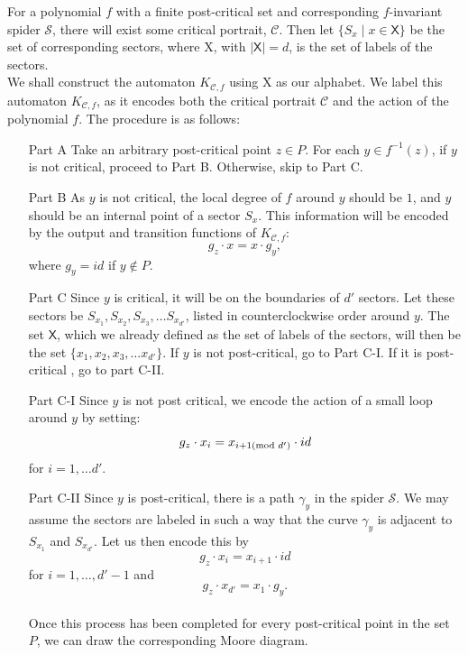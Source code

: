 \documentclass[11pt]{amsart}
\theoremstyle{definition}
\theoremstyle{remark}
\numberwithin{equation}{section}
\begin{document}
\indent For a polynomial $f$ with a finite post-critical set and corresponding $f$-invariant spider $\mathcal{S}$, there will exist some critical portrait, $\mathcal{C}$. Then let $\{S_x \mid x\in \textsf{X}\}$ be the set of corresponding sectors, where \textsf{X}, with $|\textsf{X}|=d$, is the set of labels of the sectors.\\
\indent We shall construct the automaton $K_{\mathcal{C},f}$ using \textsf{X} as our alphabet. We label this automaton $K_{\mathcal{C},f}$, as it encodes both the critical portrait $\mathcal{C}$ and the action of the polynomial $f$. The procedure is as follows:\\


\begin{enumerate}

\item[Part A] Take an arbitrary post-critical point $z\in P$. For each $y\in f^{-1}(z)$, if $y$ is not critical, proceed to Part B. Otherwise, skip to Part C.\\
\item[Part B] As $y$ is not critical, the local degree of $f$ around $y$ should be $1$, and $y$ should be an internal point of a sector $S_x$. This information will be encoded by the output and transition functions of $K_{\mathcal{C},f}$: $$g_z\cdot x=x\cdot g_y,$$
where $g_y=id$ if $y\notin P$.\\
\item[Part C] Since $y$ is critical, it will be on the boundaries of $d'$ sectors. Let these sectors be $S_{x_1},S_{x_2},S_{x_3},\ldots S_{x_{d'}}$, listed in counterclockwise order around $y$. The set $\mathsf{X}$, which we already defined as the set of labels of the sectors, will then be the set $\{x_1, x_2,x_3,\ldots x_{d'}\}$. If $y$ is not post-critical, go to Part C-I. If it is post-critical , go to part C-II.\\
\item[Part C-I] Since $y$ is not post critical, we encode the action of a small loop around $y$ by setting: $$g_z\cdot x_i=x_{i+1 (\textmd{mod } d')}\cdot id$$ for $i=1,\ldots d'$.\\
\item[Part C-II] Since $y$ is post-critical, there is a path $\gamma_y$ in the spider $\mathcal{S}$. We may assume the sectors are labeled in such a way that the curve $\gamma_y$ is adjacent to $S_{x_1}$ and $S_{x_{d'}}$. Let us then encode this by $$g_z\cdot x_i=x_{i+1}\cdot id$$ for $i=1,\ldots,d'-1$ and $$g_z\cdot x_{d'}=x_1\cdot g_y.$$\\

Once this process has been completed for every post-critical point in the set $P$, we can draw the corresponding Moore diagram.\\

\end{enumerate}
\end{document}
